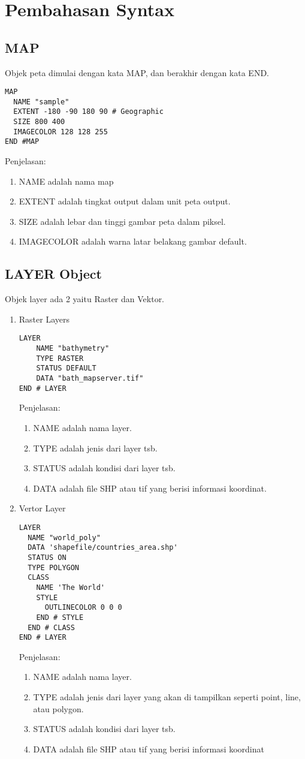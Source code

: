 \section{Pembahasan Syntax}
\subsection{MAP}
Objek peta dimulai dengan kata MAP, dan berakhir dengan kata END.
\begin{lstlisting}
MAP
  NAME "sample"
  EXTENT -180 -90 180 90 # Geographic
  SIZE 800 400
  IMAGECOLOR 128 128 255
END #MAP
\end{lstlisting}

Penjelasan:
\begin{enumerate}
\item NAME adalah nama map
\item EXTENT adalah tingkat output dalam unit peta output.
\item SIZE adalah lebar dan tinggi gambar peta dalam piksel.
\item IMAGECOLOR adalah warna latar belakang gambar default.
\end{enumerate}

\subsection{LAYER Object}
Objek layer ada 2 yaitu Raster dan Vektor.
\begin{enumerate}
\item Raster Layers
\begin{lstlisting}
LAYER
    NAME "bathymetry"
    TYPE RASTER
    STATUS DEFAULT
    DATA "bath_mapserver.tif"
END # LAYER
\end{lstlisting}

Penjelasan:
\begin{enumerate}
\item NAME adalah nama layer.
\item TYPE adalah jenis dari layer tsb.
\item STATUS adalah kondisi dari layer tsb.
\item DATA adalah file SHP atau tif yang berisi informasi koordinat.
\end{enumerate}

\item Vertor Layer
\begin{lstlisting}
LAYER
  NAME "world_poly"
  DATA 'shapefile/countries_area.shp'
  STATUS ON
  TYPE POLYGON
  CLASS
    NAME 'The World'
    STYLE
      OUTLINECOLOR 0 0 0
    END # STYLE
  END # CLASS
END # LAYER
\end{lstlisting}

Penjelasan:
\begin{enumerate}
\item NAME adalah nama layer.
\item TYPE adalah jenis dari layer yang akan di tampilkan seperti point, line, atau polygon.
\item STATUS adalah kondisi dari layer tsb.
\item DATA adalah file SHP atau tif yang berisi informasi koordinat
\end{enumerate}
\end{enumerate}
